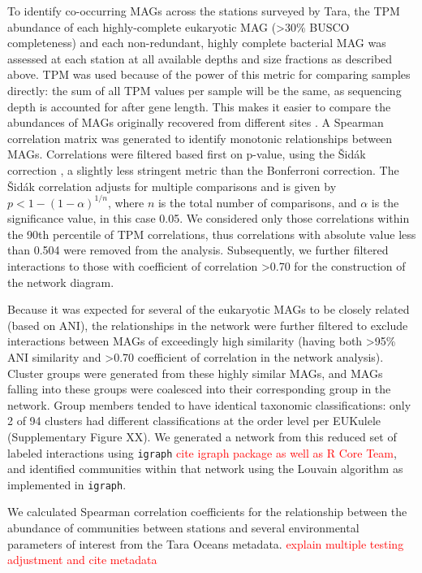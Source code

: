 \documentclass[12pt]{article}
\numberwithin{equation}{section}
\begin{document}
To identify co-occurring MAGs across the stations surveyed by Tara, the TPM abundance of each highly-complete eukaryotic MAG (>30\% BUSCO completeness) and each non-redundant, highly complete bacterial MAG was assessed at each station at all available depths and size fractions as described above. TPM was used because of the power of this metric for comparing samples directly: the sum of all TPM values per sample will be the same, as sequencing depth is accounted for after gene length. This makes it easier to compare the abundances of MAGs originally recovered from different sites \citep{Gradoville_2017}.  A Spearman correlation matrix was generated to identify monotonic relationships between MAGs. Correlations were filtered based first on p-value, using the Šidák correction \citep{Sidak_1967}, a slightly less stringent metric than the Bonferroni correction. The Šidák correlation adjusts for multiple comparisons and is given by $p < 1-(1-\alpha)^{1/n}$, where $n$ is the total number of comparisons, and $\alpha$ is the significance value, in this case 0.05. We considered only those correlations within the 90th percentile of TPM correlations, thus correlations with absolute value less than 0.504 were removed from the analysis. Subsequently, we further filtered interactions to those with coefficient of correlation >0.70 for the construction of the network diagram. 

Because it was expected for several of the eukaryotic MAGs to be closely related (based on ANI), the relationships in the network were further filtered to exclude interactions between MAGs of exceedingly high similarity (having both >95\% ANI similarity and >0.70 coefficient of correlation in the network analysis). Cluster groups were generated from these highly similar MAGs, and MAGs falling into these groups were coalesced into their corresponding group in the network. Group members tended to have identical taxonomic classifications: only 2 of 94 clusters had different classifications at the order level per EUKulele (Supplementary Figure XX). We generated a network from this reduced set of labeled interactions using \texttt{igraph} \textcolor{red}{cite igraph package as well as R Core Team}, and identified communities within that network using the Louvain algorithm as implemented in \texttt{igraph}. 

We calculated Spearman correlation coefficients for the relationship between the abundance of communities between stations and several environmental parameters of interest from the Tara Oceans metadata. \textcolor{red}{explain multiple testing adjustment and cite metadata}




\end{document}
